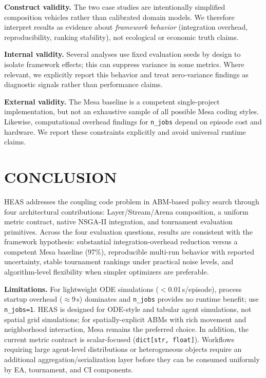 \documentclass{wscpaperproc}
\begin{document}
\textbf{Construct validity.} The two case studies are intentionally simplified
composition vehicles rather than calibrated domain models. We therefore interpret
results as evidence about \emph{framework behavior} (integration overhead,
reproducibility, ranking stability), not ecological or economic truth claims.

\textbf{Internal validity.} Several analyses use fixed evaluation seeds by
design to isolate framework effects; this can suppress variance in some metrics.
Where relevant, we explicitly report this behavior and treat zero-variance
findings as diagnostic signals rather than performance claims.

\textbf{External validity.} The Mesa baseline is a competent single-project
implementation, but not an exhaustive sample of all possible Mesa coding styles.
Likewise, computational overhead findings for \texttt{n\_jobs} depend on episode
cost and hardware. We report these constraints explicitly and avoid universal
runtime claims.

\section{CONCLUSION}

HEAS addresses the coupling code problem in ABM-based policy search through
four architectural contributions: Layer/Stream/Arena composition, a uniform
metric contract, native NSGA-II integration, and tournament evaluation
primitives. Across the four evaluation questions, results are consistent with
the framework hypothesis: substantial integration-overhead reduction versus a
competent Mesa baseline (97\%), reproducible multi-run behavior with reported
uncertainty, stable tournament rankings under practical noise levels, and
algorithm-level flexibility when simpler optimizers are preferable.

\textbf{Limitations.} For lightweight ODE simulations ($<$0.01\,s/episode),
process startup overhead ($\approx$9\,s) dominates and \texttt{n\_jobs}
provides no runtime benefit; use \texttt{n\_jobs=1}. HEAS is designed for
ODE-style and tabular agent simulations, not spatial grid simulations; for
spatially-explicit ABMs with rich movement and neighborhood interaction, Mesa
remains the preferred choice. In addition, the current metric contract is
scalar-focused (\texttt{dict[str, float]}). Workflows requiring large
agent-level distributions or heterogeneous objects require an additional
aggregation/serialization layer before they can be consumed uniformly by EA,
tournament, and CI components.
\end{document}
